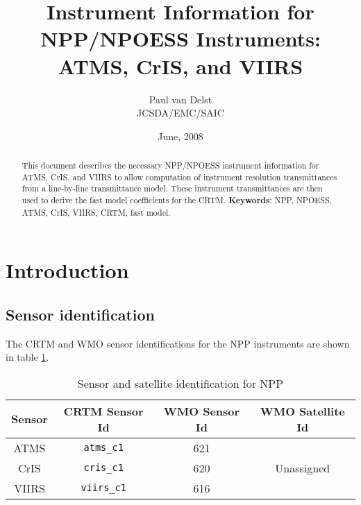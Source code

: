 




\newcommand{\rb}[1]{\raisebox{1.5ex}[0pt]{#1}}
\newcommand{\frequency}[1]{\ensuremath{f_{#1}}}
\newcommand{\bfrequency}[1]{\boldmath\frequency{#1}\unboldmath}
\newcommand{\bdf}[1]{\boldmath\df{#1}\unboldmath}
\newcommand{\sideband}[1]{\ensuremath{df_{#1}}}
\newcommand{\bsideband}[1]{\boldmath\sideband{#1}\unboldmath}

\title{Instrument Information for NPP/NPOESS Instruments: ATMS, CrIS, and VIIRS}
\author{Paul van Delst\\JCSDA/EMC/SAIC}
\date{June, 2008}



\maketitle

\draftwatermark

\begin{abstract}
This document describes the necessary NPP/NPOESS instrument information for ATMS, CrIS, and VIIRS to allow computation of instrument resolution transmittances from a line-by-line transmittance model. These instrument transmittances are then used to derive the fast model coefficients for the CRTM.
\textbf{Keywords}: NPP, NPOESS, ATMS, CrIS, VIIRS, CRTM, fast model.
\end{abstract}

\section{Introduction}

\subsection{Sensor identification}
The CRTM and WMO\cite{WMO_Common_Code_Tables2007} sensor identifications for the NPP instruments are shown in table \ref{tab:npp_sensor_id}.
\begin{table}[htp]
  \centering
  \begin{tabular}{|c|c|c|c|}
    \hline
    \textbf{Sensor} & \textbf{CRTM Sensor Id} & \textbf{WMO Sensor Id} & \textbf{WMO Satellite Id} \\
    \hline\hline
    ATMS  & \texttt{atms\_c1}  & 621 &            \\
    CrIS  & \texttt{cris\_c1}  & 620 & Unassigned \\
    VIIRS & \texttt{viirs\_c1} & 616 &            \\
    \hline
  \end{tabular}
  \caption{Sensor and satellite identification for NPP}
  \label{tab:npp_sensor_id}
\end{table}


